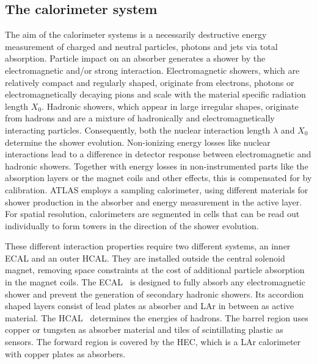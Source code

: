 \subsection{The calorimeter system}
The aim of the calorimeter systems is a necessarily destructive energy measurement of charged and neutral particles, photons and jets via total absorption. 
%
Particle impact on an absorber generates a shower by the electromagnetic and/or strong interaction. Electromagnetic showers, which are relatively compact and regularly shaped, originate from electrons, photons or electromagnetically decaying pions and scale with the material specific radiation length $X_0$. Hadronic showers, which appear in large irregular shapes, originate from hadrons and are a mixture of hadronically and electromagnetically interacting particles. Consequently, both the nuclear interaction length $\lambda$ and $X_0$ determine the shower evolution. 
%
Non-ionizing energy losses like nuclear interactions lead to a difference in detector response between electromagnetic and hadronic showers.
Together with energy losses in non-instrumented parts like the absorption layers or the magnet coils and other effects, this is compensated for by calibration.
%
\gls{ATLAS} employs a sampling calorimeter, using different materials for shower production in the absorber and energy measurement in the active layer.
%
For spatial resolution, calorimeters are segmented in cells that can be read out individually to form towers in the direction of the shower evolution. 

These different interaction properties require two different systems, an inner \gls{ECAL} and an outer \gls{HCAL}. 
%
They are installed outside the central solenoid magnet, removing space constraints at the cost of additional particle absorption in the magnet coils. 
%
The \gls{ECAL}~\cite{calo,LAr} is designed to fully absorb any electromagnetic shower and prevent the generation of secondary hadronic showers. Its accordion shaped layers consist of lead plates as absorber and \gls{LAr} in between as active material. 
%
The \gls{HCAL}~\cite{calo,Tile} determines the energies of hadrons. The barrel region uses copper or tungsten as absorber material and tiles of scintillating plastic as sensors. The forward region is covered by the \gls{HEC}, which is a \gls{LAr} calorimeter with copper plates as absorbers.
%









